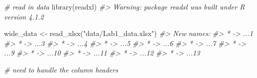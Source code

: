 \documentclass[
]{book}
\newenvironment{Shaded}{\begin{snugshade}}{\end{snugshade}}
\newcommand{\CommentTok}[1]{\textcolor[rgb]{0.56,0.35,0.01}{\textit{#1}}}
\newcommand{\FunctionTok}[1]{\textcolor[rgb]{0.00,0.00,0.00}{#1}}
\newcommand{\NormalTok}[1]{#1}
\newcommand{\OtherTok}[1]{\textcolor[rgb]{0.56,0.35,0.01}{#1}}
\newcommand{\StringTok}[1]{\textcolor[rgb]{0.31,0.60,0.02}{#1}}
\theoremstyle{definition}
\theoremstyle{definition}
\theoremstyle{definition}
\theoremstyle{definition}
\theoremstyle{remark}
\begin{document}
\begin{Shaded}
\begin{Highlighting}[]
\CommentTok{\# read in data}
\FunctionTok{library}\NormalTok{(readxl)}
\CommentTok{\#\textgreater{} Warning: package \textquotesingle{}readxl\textquotesingle{} was built under R version 4.1.2}

\NormalTok{wide\_data }\OtherTok{\textless{}{-}} \FunctionTok{read\_xlsx}\NormalTok{(}\StringTok{"data/Lab1\_data.xlsx"}\NormalTok{)}
\CommentTok{\#\textgreater{} New names:}
\CommentTok{\#\textgreater{} * \textasciigrave{}\textasciigrave{} {-}\textgreater{} \textasciigrave{}...1\textasciigrave{}}
\CommentTok{\#\textgreater{} * \textasciigrave{}\textasciigrave{} {-}\textgreater{} \textasciigrave{}...3\textasciigrave{}}
\CommentTok{\#\textgreater{} * \textasciigrave{}\textasciigrave{} {-}\textgreater{} \textasciigrave{}...4\textasciigrave{}}
\CommentTok{\#\textgreater{} * \textasciigrave{}\textasciigrave{} {-}\textgreater{} \textasciigrave{}...5\textasciigrave{}}
\CommentTok{\#\textgreater{} * \textasciigrave{}\textasciigrave{} {-}\textgreater{} \textasciigrave{}...6\textasciigrave{}}
\CommentTok{\#\textgreater{} * \textasciigrave{}\textasciigrave{} {-}\textgreater{} \textasciigrave{}...7\textasciigrave{}}
\CommentTok{\#\textgreater{} * \textasciigrave{}\textasciigrave{} {-}\textgreater{} \textasciigrave{}...9\textasciigrave{}}
\CommentTok{\#\textgreater{} * \textasciigrave{}\textasciigrave{} {-}\textgreater{} \textasciigrave{}...10\textasciigrave{}}
\CommentTok{\#\textgreater{} * \textasciigrave{}\textasciigrave{} {-}\textgreater{} \textasciigrave{}...11\textasciigrave{}}
\CommentTok{\#\textgreater{} * \textasciigrave{}\textasciigrave{} {-}\textgreater{} \textasciigrave{}...12\textasciigrave{}}
\CommentTok{\#\textgreater{} * \textasciigrave{}\textasciigrave{} {-}\textgreater{} \textasciigrave{}...13\textasciigrave{}}

\CommentTok{\# need to handle the column headers}


\end{Highlighting}
\end{Shaded}
\end{document}
